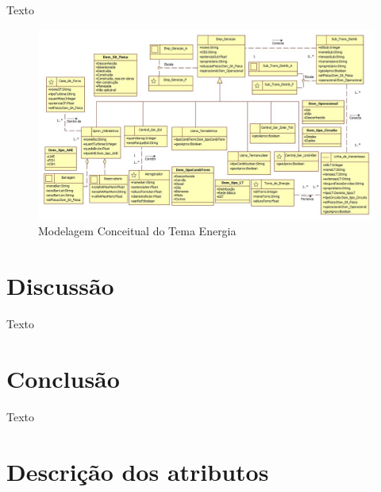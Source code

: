 \documentclass[preprint,authoryear,12pt]{elsarticle}
\begin{document}
Texto



\begin{figure}[H]
\centering
\includegraphics[width=\textwidth]{fig} 
\caption{Modelagem Conceitual do Tema Energia}
\label{fig:subim1}
\end{figure}

\section{Discuss\~ao}
\label{sec6}
Texto

\section{Conclus\~ao}
\label{sec7}
Texto

\appendix
\section{Descri\c{c}\~ao dos atributos}
\label{appendix}


\end{document}
